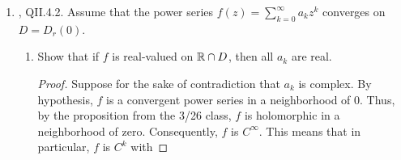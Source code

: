 \documentclass[../psets.tex]{subfiles}
\begin{document}
\begin{enumerate}[ref={A.\arabic*}]
\begin{enumerate}
\begin{proof}
\begin{equation*}
                f''(z) = \frac{(1-z)^2\cdot(\e[1-z]-z\e[1-z])-z\e[1-z]\cdot 2(1-z)^1\cdot -1}{(1-z)^4}
                = \frac{(1+z^2)\e[1-z]}{(1-z)^3}
            \end{equation*}
            Then by the second derivative of the CIF,
            \begin{align*}
                f''(0) &= \frac{2!}{2\pi i}\int_{|z|=1/2}\frac{f(z)}{(z-0)^{2+1}}\dd{z}\\
                \e &= \frac{1}{\pi i}\int_{|z|=1/2}\frac{f(z)}{z^3}\dd{z}\\
                \Aboxed{\pi i\e &= \int_{|z|=1/2}\frac{\e[1-z]}{z^3(1-z)}\dd{z}}
            \end{align*}
        \end{proof}
        \item $\displaystyle\int_{|z-1|=1}\left( \frac{z}{z-1} \right)^n\dd{z}$ for any $n\geq 1$.
        \begin{proof}
            Let
            \begin{equation*}
                f(z) = z^n
            \end{equation*}
            Then by the $(n-1)^\text{th}$ derivative of the CIF,
            \begin{align*}
                f^{(n-1)}(1) &= \frac{(n-1)!}{2\pi i}\int_{|z-1|=1}\frac{f(z)}{(z-1)^n}\dd{z}\\
                n! &= \frac{(n-1)!}{2\pi i}\int_{|z-1|=1}\frac{z^n}{(z-1)^n}\dd{z}\\
                \Aboxed{2\pi ni &= \int_{|z-1|=1}\left( \frac{z}{z-1} \right)^n\dd{z}}
            \end{align*}
        \end{proof}
    \end{enumerate}
    \item \textcite{bib:FischerLieb}, QII.4.2. Assume that the power series $f(z)=\sum_{k=0}^\infty a_kz^k$ converges on $D=D_r(0)$.
    \begin{enumerate}
        \item Show that if $f$ is real-valued on $\mathbb{R}\cap D$, then all $a_k$ are real.
        \begin{proof}
            Suppose for the sake of contradiction that $a_k$ is complex. By hypothesis, $f$ is a convergent power series in a neighborhood of 0. Thus, by the proposition from the 3/26 class, $f$ is holomorphic in a neighborhood of zero. Consequently, $f$ is $C^\infty$. This means that in particular, $f$ is $C^k$ with

\end{proof}
\end{enumerate}
\end{enumerate}
\end{document}
